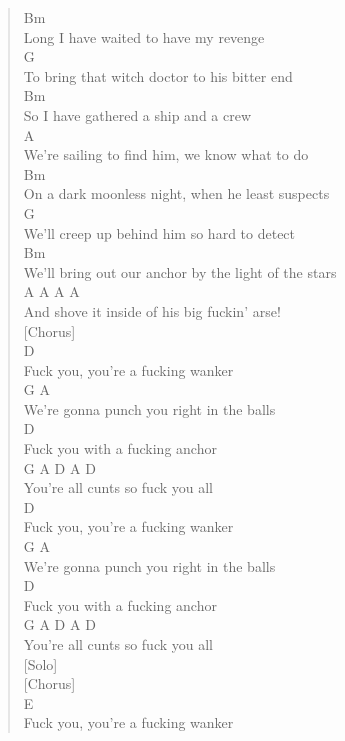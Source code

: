\documentclass[11pt]{article}
\begin{document}
\begin{verse}
Bm\\
Long I have waited to have my revenge\\
G\\
To bring that witch doctor to his bitter end\\
Bm\\
So I have gathered a ship and a crew\\
A\\
We're sailing to find him, we know what to do\\
Bm\\
On a dark moonless night, when he least suspects\\
G\\
We'll creep up behind him so hard to detect\\
Bm\\
We'll bring out our anchor by the light of the stars\\
A                                           A A A\\
And shove it inside of his big fuckin' arse!\\
\vspace*{1em}
[Chorus]\\
D\\
Fuck you, you're a fucking wanker\\
G                      A\\
We're gonna punch you right in the balls\\
D\\
Fuck you with a fucking anchor\\
G           A        D    A   D\\
You're all cunts so fuck you all\\
D\\
Fuck you, you're a fucking wanker\\
G                      A\\
We're gonna punch you right in the balls\\
D\\
Fuck you with a fucking anchor\\
G           A        D    A   D\\
You're all cunts so fuck you all\\
\vspace*{1em}
[Solo]\\
\vspace*{1em}
[Chorus]\\
E\\
Fuck you, you're a fucking wanker\\

\end{verse}
\end{document}
